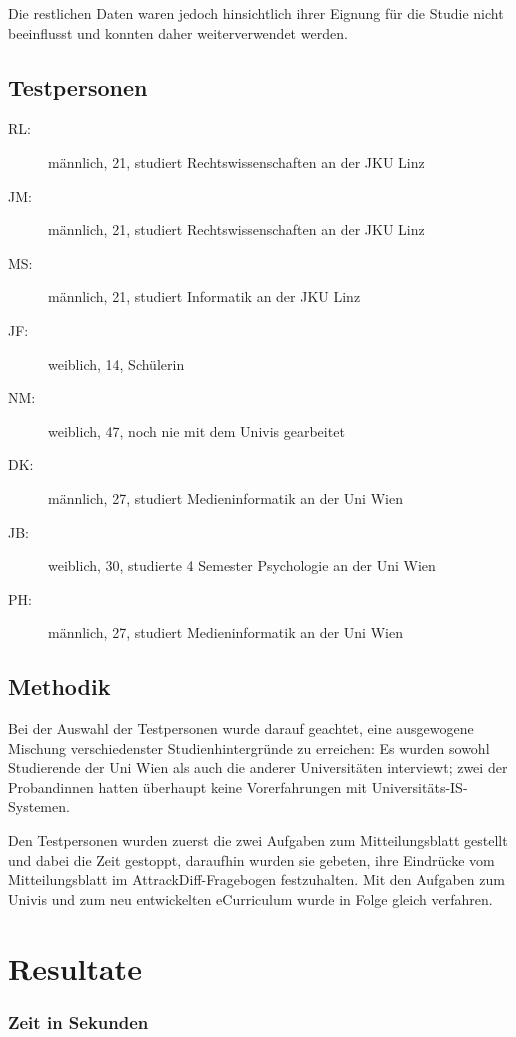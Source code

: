\documentclass[a4paper,10pt]{scrartcl}
\begin{document}
Die restlichen Daten waren jedoch hinsichtlich ihrer Eignung für die Studie nicht beeinflusst und konnten daher weiterverwendet werden.

\subsection{Testpersonen}

\begin{description}
 \item[RL:] männlich, 21, studiert Rechtswissenschaften an der JKU Linz
 \item[JM:] männlich, 21, studiert Rechtswissenschaften an der JKU Linz
 \item[MS:] männlich, 21, studiert Informatik an der JKU Linz
 \item[JF:] weiblich, 14, Schülerin
 \item[NM:] weiblich, 47, noch nie mit dem Univis gearbeitet
 \item[DK:] männlich, 27, studiert Medieninformatik an der Uni Wien
 \item[JB:] weiblich, 30, studierte 4 Semester Psychologie an der Uni Wien
 \item[PH:] männlich, 27, studiert Medieninformatik an der Uni Wien
\end{description}

\subsection{Methodik}

Bei der Auswahl der Testpersonen wurde darauf geachtet, eine ausgewogene Mischung verschiedenster Studienhintergründe zu erreichen: Es wurden sowohl Studierende der Uni Wien als auch die anderer Universitäten interviewt; zwei der Probandinnen hatten überhaupt keine Vorerfahrungen mit Universitäts-IS-Systemen.

Den Testpersonen wurden zuerst die zwei Aufgaben zum Mitteilungsblatt gestellt und dabei die Zeit gestoppt, daraufhin wurden sie gebeten, ihre Eindrücke vom Mitteilungsblatt im AttrackDiff-Fragebogen festzuhalten. Mit den Aufgaben zum Univis und zum neu entwickelten eCurriculum wurde in Folge gleich verfahren.

\section{Resultate} 


\subsubsection*{Zeit in Sekunden} 
\end{document}
